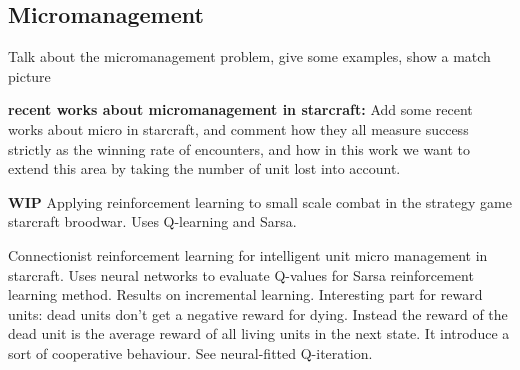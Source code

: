
\subsection{Micromanagement}

Talk about the micromanagement problem, give some examples, show a
match picture

{\bf recent works about micromanagement in starcraft:} Add some recent
works about micro in starcraft, and comment how they all measure
success strictly as the winning rate of encounters, and how in this
work we want to extend this area by taking the number of unit lost
into account.

{\bf WIP}
Applying reinforcement learning to small scale combat in the strategy
game starcraft broodwar. Uses Q-learning and Sarsa. \cite{WeWa12}

Connectionist reinforcement learning for intelligent unit micro
management in starcraft.  Uses neural networks to evaluate Q-values
for Sarsa reinforcement learning method. Results on incremental
learning.  Interesting part for reward units: dead units don’t get a
negative reward for dying.  Instead the reward of the dead unit is the
average reward of all living units in the next state.  It introduce a
sort of cooperative behaviour. See neural-fitted Q-iteration. \cite{ShBeWi11}

